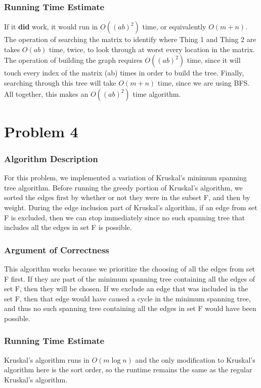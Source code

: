 \documentclass{math}
\begin{document}
\subsubsection*{Running Time Estimate}
If it \textbf{did} work, it would run in \( O((ab)^2) \) time, or equivalently
\( O(m+n) \). The operation of searching the matrix to identify where Thing 1
and Thing 2 are takes \( O(ab) \) time, twice, to look through at worst every
location in the matrix. The operation of building the graph requires
\( O((ab)^2) \) time, since it will touch every index of the matrix (ab) times
in order to build the tree. Finally, searching through this tree will take
\( O(m+n) \) time, since we are using BFS. All together, this makes an
\( O((ab)^2) \) time algorithm.

\section*{Problem 4}

\subsubsection*{Algorithm Description}
For this problem, we implemented a variation of Kruskal's minimum spanning tree
algorithm. Before running the greedy portion of Kruskal's algorithm, we sorted
the edges first by whether or not they were in the subset F, and then by weight.
During the edge inclusion part of Kruskal's algorithm, if an edge from set F is
excluded, then we can stop immediately since no such spanning tree that includes
all the edges in set F is possible.

\subsubsection*{Argument of Correctness}
This algorithm works because we prioritize the choosing of all the edges from
set F first. If they are part of the minimum spanning tree containing all the
edges of set F, then they will be chosen. If we exclude an edge that was
included in the set F, then that edge would have caused a cycle in the minimum
spanning tree, and thus no such spanning tree containing all the edges in set
F would have been possible.

\subsubsection*{Running Time Estimate}
Kruskal's algorithm runs in \( O(m\log n) \) and the only modification to
Kruskal's algorithm here is the sort order, so the runtime remains the same as
the regular Kruskal's algorithm.
\end{document}
